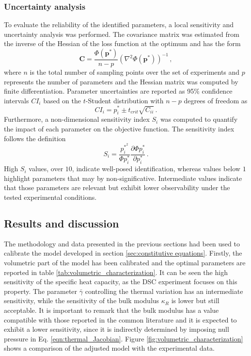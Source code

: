 \subsubsection{Uncertainty analysis}

To evaluate the reliability of the identified parameters, a local sensitivity and uncertainty analysis was performed. The covariance matrix was estimated from the inverse of the Hessian of the loss function at the optimum and has the form
\begin{equation}
  \mathbf{C} = \frac{\Phi(\mathbf{p}^*)}{n-p}\left(\nabla^2\Phi(\mathbf{p}^*)\right)^{-1} \,,
\end{equation}
where $n$ is the total number of sampling points over the set of experiments and $p$ represents the number of parameters and the Hessian matrix was computed by finite differentiation.
Parameter uncertainties are reported as 95\% confidence intervals $CI_i$ based on the $t$-Student distribution with $n-p$ degrees of freedom as
\begin{equation}
  CI_i = p_i^* \pm t_{crit} \sqrt{C_{ii}} \,.
\end{equation}
Furthermore, a non-dimensional sensitivity index $S_i$ was computed to quantify the impact of each parameter on the objective function. The sensitivity index follows the definition
\begin{equation}
  S_i = \frac{p_i^{*^2}}{\Phi{p_i^*}}\frac{\partial \Phi{p_i^*}}{\partial p_i^*} \,.
\end{equation}
High $S_i$ values, over $10$, indicate well-posed identification, whereas values below $1$ highlight parameters that may by non-significative. Intermediate values indicate that those parameters are relevant but exhibit lower observability under the tested experimental conditions.



\subsection{Results and discussion}

The methodology and data presented in the previous sections had been used to calibrate the model developed in section \ref{sec:constitutive equations}. Firstly, the volumetric part of the model has been calibrated and the optimal parameters are reported in table \ref{tab:volumetric_characterization}. It can be seen the high sensitivity of the specific heat capacity, as the DSC experiment focuses on this property. The parameter $\bar\gamma$ controlling the thermal variation has an intermediate sensitivity, while the sensitivity of the bulk modulus $\kappa_R$ is lower but still acceptable. It is important to remark that the bulk modulus has a value compatible with those reported in the common literature and it is expected to exhibit a lower sensitivity, since it is indirectly determined by imposing null pressure in Eq. \eqref{eqn:thermal_Jacobian}. Figure \ref{fig:volumetric_characterization} shows a comparison of the adjusted model with the experimental data.

